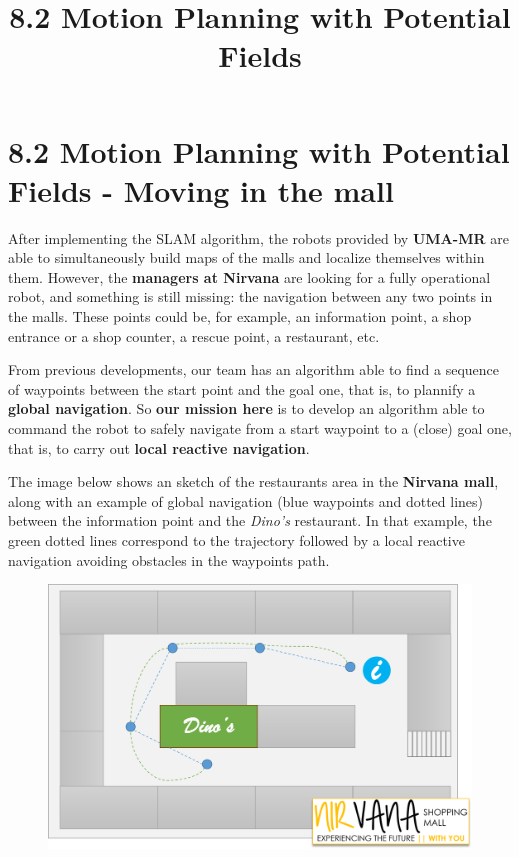 \documentclass[11pt]{article}
\title{8.2 Motion Planning with Potential Fields}
\begin{document}
    
    \maketitle
    
    

    
    \hypertarget{motion-planning-with-potential-fields---moving-in-the-mall}{%
\section{8.2 Motion Planning with Potential Fields - Moving in the
mall}\label{motion-planning-with-potential-fields---moving-in-the-mall}}

After implementing the SLAM algorithm, the robots provided by
\textbf{{UMA-MR}} are able to simultaneously build maps of the malls and
localize themselves within them. However, the \textbf{{managers at
Nirvana}} are looking for a fully operational robot, and something is
still missing: the navigation between any two points in the malls. These
points could be, for example, an information point, a shop entrance or a
shop counter, a rescue point, a restaurant, etc.

From previous developments, our team has an algorithm able to find a
sequence of waypoints between the start point and the goal one, that is,
to plannify a \textbf{global navigation}. So \textbf{our mission here}
is to develop an algorithm able to command the robot to safely navigate
from a start waypoint to a (close) goal one, that is, to carry out
\textbf{local reactive navigation}.

The image below shows an sketch of the restaurants area in the
\textbf{{Nirvana mall}}, along with an example of global navigation
(blue waypoints and dotted lines) between the information point and the
\emph{Dino's} restaurant. In that example, the green dotted lines
correspond to the trajectory followed by a local reactive navigation
avoiding obstacles in the waypoints path.

\begin{figure}
\centering
\includegraphics{mall_navigation_example2.png}
\end{figure}
\end{document}
